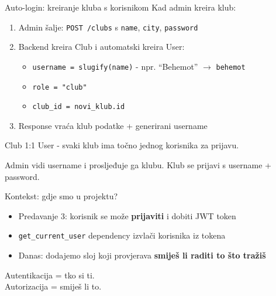 \begin{frame}{Auto-login: kreiranje kluba s korisnikom}
Kad admin kreira klub:
\begin{enumerate}
  \item Admin šalje: \texttt{POST /clubs} s \texttt{name}, \texttt{city}, \texttt{password}
  \item Backend kreira Club i automatski kreira User:
  \begin{itemize}
    \item \texttt{username = slugify(name)} - npr. \enquote{Behemot} $\rightarrow$ \texttt{behemot}
    \item \texttt{role = "club"}
    \item \texttt{club\_id = novi\_klub.id}
  \end{itemize}
  \item Response vraća klub podatke + generirani username
\end{enumerate}

\vspace{0.6em}
Club 1:1 User - svaki klub ima točno jednog korisnika za prijavu.

\vspace{0.4em}
Admin vidi username i prosljeđuje ga klubu. Klub se prijavi s username + password.
\end{frame}

\begin{frame}{Kontekst: gdje smo u projektu?}
\begin{itemize}
  \item Predavanje 3: korisnik se može \textbf{prijaviti} i dobiti JWT token
  \item \texttt{get\_current\_user} dependency izvlači korisnika iz tokena
  \item Danas: dodajemo sloj koji provjerava \textbf{smiješ li raditi to što tražiš}
\end{itemize}

\vspace{0.6em}
\begin{center}
\Large Autentikacija = tko si ti. \\ Autorizacija = smiješ li to.
\end{center}
\end{frame}

